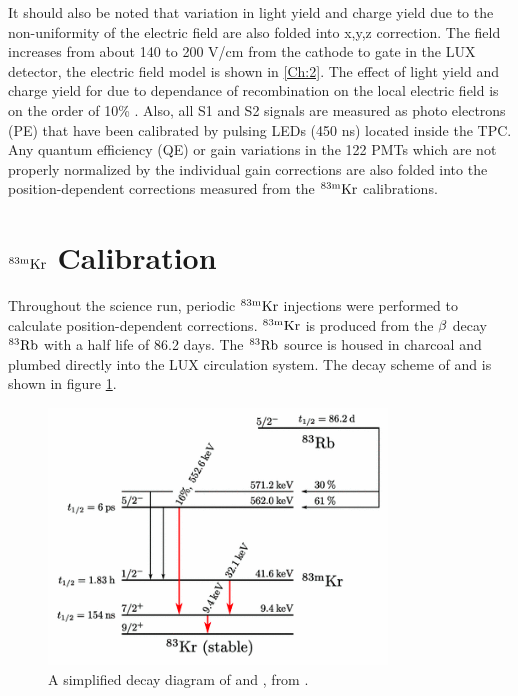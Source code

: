 It should also be noted that variation in light yield and charge yield due to the non-uniformity of the electric field are also folded into x,y,z correction.  The field increases from about 140 to 200 V/cm from the cathode to gate in the LUX detector, the electric field model is shown in \ref{Ch:2}. The effect of light yield and charge yield for \KrCal due to dependance of recombination on the local electric field is on the order of 10\% \cite{NEST_2013}. Also, all S1 and S2 signals are measured as photo electrons (PE) that have been calibrated by pulsing LEDs (450 ns) located inside the TPC. Any quantum efficiency (QE) or gain variations in the 122 PMTs which are not properly normalized by the individual gain corrections are also folded into the position-dependent corrections measured from the $\rm^{83m}Kr$ calibrations.


\section{$\rm^{83m}Kr$ Calibration}

Throughout the science run, periodic $\rm^{83m}Kr$ injections were performed to calculate position-dependent corrections. $\rm ^{83m}Kr$ is produced from the $\rm \beta$ decay $\rm^{83}Rb$ with a half life of 86.2 days. The $\rm^{83}Rb$ source is housed in charcoal and plumbed directly into the LUX circulation system. The decay scheme of \Rb and \KrCal is shown in figure \ref{fig:Kr_Decay}.

\begin{figure}[h!]\centering
\includegraphics[width=90mm]{Chapter_XYZ_Corr/Thesis_Corr_Plots/RbKr_83_Decay.png}
\caption{A simplified decay diagram of \Rb and \KrCal, from \cite{Kr_Decay_Diagram}.}
\label{fig:Kr_Decay}
\end{figure}

